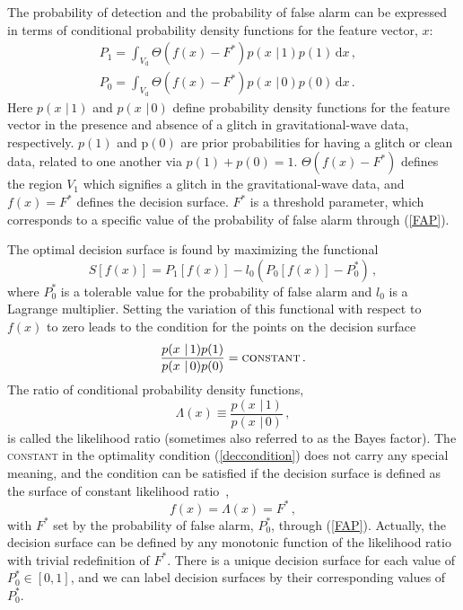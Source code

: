 \documentclass[prd, twocolumn, lengthcheck, superscriptaddress, showpacs, letterpaper, nofootinbib]{revtex4-1}
\newcommand\given{\,\,|\,}
\newcommand\auxvec{x}
\newcommand\Vdata{V_\mathrm{d}}
\newcommand\Ft{\ensuremath{F^\ast}}
\newcommand\Pt{\ensuremath{P_0^\ast}}
\newcommand\diff{\, \mathrm{d}}
\begin{document}
The probability of detection and the probability of false alarm can be expressed in terms of conditional probability density functions for the feature vector, $\auxvec$:                  
\begin{subequations}
\label{detfapprobs}
\begin{align}
P_{1} = \int_{\Vdata}\! \Theta\left(f(\auxvec) - \Ft \right)p(\auxvec \given 1) p(1) \diff \auxvec\,,&\\
\label{FAP} P_{0} = \int_{\Vdata} \! \Theta\left(f(\auxvec) - \Ft \right)p(\auxvec \given 0) p(0) \diff \auxvec \,.
 \end{align}
\end{subequations}
Here $p(\auxvec \given 1)$ and $p(\auxvec \given 0)$ define probability density functions for the feature vector in the presence and absence of a glitch in gravitational-wave data, respectively. $p(1)$ and p$(0)$ are prior probabilities for having a glitch or clean data, related to one another via $p(1) + p(0) = 1$. $\Theta\left(f(\auxvec) - \Ft \right)$ defines the region $V_1$ which signifies a glitch in the gravitational-wave data, and $f(\auxvec) =\Ft$ defines the decision surface. $\Ft$ is a threshold parameter, which corresponds to a specific value of the probability of false alarm through (\ref{FAP}).      

The optimal decision surface is found by maximizing the functional
\begin{equation}
\label{Sfunc}
S[f(\auxvec)] = P_{1}[f(\auxvec)] - l_0\left( P_{0}[f(\auxvec)] - \Pt\right)\,,
\end{equation}
where $\Pt$ is a tolerable value for the probability of false alarm and $l_0$ is a Lagrange multiplier. Setting the variation of this functional with respect to $f(\auxvec)$ to zero leads to the condition for the points on the decision surface
\begin{equation}
\label{deccondition}
\frac{p(\auxvec \given 1) p(1)}{p(\auxvec \given 0) p(0)} = \textsc{constant}\,.
\end{equation}
The ratio of conditional probability density functions,
\begin{equation}
\label{lrdef}
\Lambda(x) \equiv \frac{p(\auxvec \given 1)}{p(\auxvec \given 0)}\,,
\end{equation}
is called the likelihood ratio (sometimes also referred to as the Bayes factor). The \textsc{constant} in the optimality condition (\ref{deccondition}) does not carry any special meaning, and the condition can be satisfied if the decision surface is defined as the surface of constant likelihood ratio~\cite{Biswas2012a},
\begin{equation}
\label{decsurface}
f(\auxvec) = \Lambda(\auxvec) = \Ft \,,
\end{equation}
with $\Ft$ set by the probability of false alarm, $\Pt$, through (\ref{FAP}). Actually, the decision surface can be defined by any monotonic function of the likelihood ratio with trivial redefinition of $\Ft$. There is a unique decision surface for each value of $\Pt\in [0,1]$, and we can label decision surfaces by their corresponding values of $\Pt$. 
\end{document}
